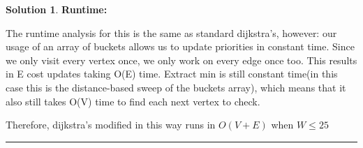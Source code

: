 \documentclass{article}
\theoremstyle{definition}
\def\fline{\rule{0.75\linewidth}{0.5pt}}
\newcommand{\finishline}{\begin{center}\fline\end{center}}
\newtheorem*{solution*}{Solution}
\newenvironment{solution}{\begin{solution*}}{{\finishline} \end{solution*}}
\begin{document}
\begin{solution}
    \textbf{Runtime: }
    \

    The runtime analysis for this is the same as standard dijkstra's, however: our usage of an array of buckets allows us to update priorities in constant time. Since we only visit every vertex once, we only work on every edge once too. This results in E cost updates taking O(E) time.  
    Extract min is still constant time(in this case this is the distance-based sweep of the buckets array), which means that it also still takes O(V) time to find each next vertex to check.
    
    Therefore, dijkstra's modified in this way runs in $O(V + E)$ when $W\leq25$
\end{solution}

\newpage
\end{document}
